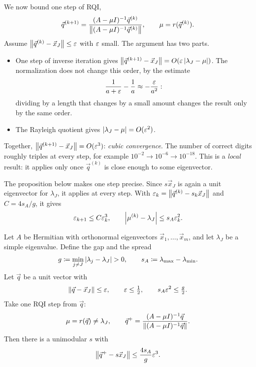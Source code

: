 We now bound one step of RQI,
\begin{equation*}
  \vec{q}^{(k+1)} = \frac{(A - \mu I)^{-1}\vec{q}^{(k)}}{\left\lVert (A - \mu I)^{-1}\vec{q}^{(k)} \right\rVert}, \qquad \mu = r(\vec{q}^{(k)}).
\end{equation*}
Assume $\left\lVert \vec{q}^{(k)} - \vec{x}_J \right\rVert \le \varepsilon$ with $\varepsilon$ small. The argument has two parts.
\begin{itemize}
  \item One step of inverse iteration gives $\left\lVert \vec{q}^{(k+1)} - \vec{x}_J \right\rVert = O(\varepsilon\left\lvert \lambda_J - \mu \right\rvert)$. The normalization does not change this order, by the estimate
  \begin{equation*}
    \frac{1}{a + \varepsilon} - \frac{1}{a} \approx -\frac{\varepsilon}{a^2}:
  \end{equation*}
  dividing by a length that changes by a small amount changes the result only by the same order.
  \item The Rayleigh quotient gives $\left\lvert \lambda_J - \mu \right\rvert = O(\varepsilon^2)$.
\end{itemize}
Together, $\left\lVert \vec{q}^{(k+1)} - \vec{x}_J \right\rVert = O(\varepsilon^3)$: \emph{cubic convergence}. The number of correct digits roughly triples at every step, for example $10^{-2} \to 10^{-6} \to 10^{-18}$. This is a \emph{local} result: it applies only once $\vec{q}^{(k)}$ is close enough to some eigenvector.

The proposition below makes one step precise. Since $s\vec{x}_J$ is again a unit eigenvector for $\lambda_J$, it applies at every step. With $\varepsilon_k = \left\lVert \vec{q}^{(k)} - s_k\vec{x}_J \right\rVert$ and $C = 4s_A/g$, it gives
\begin{equation*}
  \varepsilon_{k+1} \le C\varepsilon_k^3, \qquad \left\lvert \mu^{(k)} - \lambda_J \right\rvert \le s_A\varepsilon_k^2.
\end{equation*}

\begin{proposition}
  \label{prop:rqi-step}
  Let $A$ be Hermitian with orthonormal eigenvectors $\vec{x}_1, \dots, \vec{x}_m$, and let $\lambda_J$ be a simple eigenvalue. Define the gap and the spread
  \begin{equation*}
    g \coloneqq \min_{j \ne J}\left\lvert \lambda_j - \lambda_J \right\rvert > 0, \qquad s_A \coloneqq \lambda_{\max} - \lambda_{\min}.
  \end{equation*}
  Let $\vec{q}$ be a unit vector with
  \begin{equation*}
    \left\lVert \vec{q} - \vec{x}_J \right\rVert \le \varepsilon, \qquad \varepsilon \le \tfrac{1}{2}, \qquad s_A\varepsilon^2 \le \tfrac{g}{2}.
  \end{equation*}
  Take one RQI step from $\vec{q}$:
  \begin{equation*}
    \mu = r(\vec{q}) \ne \lambda_J, \qquad \vec{q}^+ = \frac{(A - \mu I)^{-1}\vec{q}}{\left\lVert (A - \mu I)^{-1}\vec{q} \right\rVert}.
  \end{equation*}
  Then there is a unimodular $s$ with
  \begin{equation}
    \left\lVert \vec{q}^+ - s\vec{x}_J \right\rVert \le \frac{4s_A}{g}\varepsilon^3.
  \end{equation}
\end{proposition}

